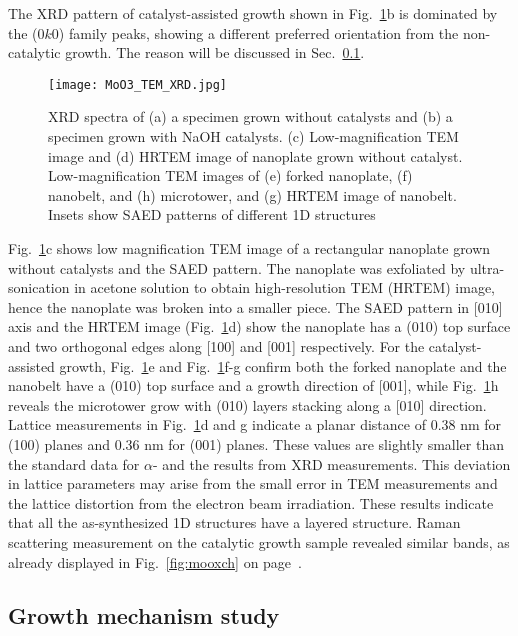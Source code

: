 The XRD pattern of catalyst-assisted growth shown in Fig.~\ref{fig:ch4tem3by3}b is dominated by the (0$k$0) family peaks, showing a different preferred orientation from the non-catalytic growth. The reason will be discussed in Sec.~\ref{sec:nasi}. 

\begin{figure}[htb]
\centering
\texttt{[image: MoO3\_TEM\_XRD.jpg]}
\caption[XRD and TEM on  catalytic growth]{XRD spectra of (a) a specimen grown without catalysts and (b) a specimen grown with NaOH catalysts. (c) Low-magnification TEM image and (d) HRTEM image of nanoplate grown without catalyst. Low-magnification TEM images of (e) forked nanoplate, (f) nanobelt, and (h) microtower, and (g) HRTEM image of nanobelt. Insets show SAED patterns of different  1D structures}
\label{fig:ch4tem3by3}
\end{figure}

Fig.~\ref{fig:ch4tem3by3}c shows low magnification TEM image of a rectangular nanoplate grown without catalysts and the SAED pattern. The nanoplate was exfoliated by ultra-sonication in acetone solution to obtain high-resolution TEM (HRTEM) image, hence the nanoplate was broken into a smaller piece. The SAED pattern in [010] axis and the HRTEM image (Fig.~\ref{fig:ch4tem3by3}d) show the nanoplate has a (010) top surface and two orthogonal edges along [100] and [001] respectively. For the catalyst-assisted growth, Fig.~\ref{fig:ch4tem3by3}e and Fig.~\ref{fig:ch4tem3by3}f-g confirm both the forked nanoplate and the nanobelt have a (010) top surface and a growth direction of [001], while Fig.~\ref{fig:ch4tem3by3}h reveals the microtower grow with (010) layers stacking along a [010] direction. Lattice measurements in Fig.~\ref{fig:ch4tem3by3}d and g indicate a planar distance of 0.38 nm for (100) planes and 0.36 nm for (001) planes. These values are slightly smaller than the standard data for $\alpha$- and the results from XRD measurements. This deviation in lattice parameters may arise from the small error in TEM measurements and the lattice distortion from the electron beam irradiation. These results indicate that all the as-synthesized 1D structures have a layered structure. Raman scattering measurement on the catalytic growth sample revealed similar  bands, as already displayed in Fig.~\ref{fig:mooxch} on page~\pageref{fig:mooxch}. 

\subsection{Growth mechanism study}\label{sec:nasi}

